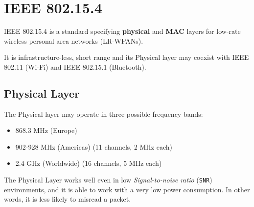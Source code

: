 
\chapter{IEEE 802.15.4}

IEEE 802.15.4 is a standard specifying \textbf{physical} and \textbf{MAC} layers for low-rate wireless personal area networks (LR-WPANs).

It is infrastructure-less, short range and its Physical layer may coexist with IEEE 802.11 (Wi-Fi) and IEEE 802.15.1 (Bluetooth). 

\section*{Physical Layer}

The Physical layer may operate in three possible frequency bands:
\begin{itemize}
   \item 868.3 MHz (Europe)
   \item 902-928 MHz (Americas) (11 channels, 2 MHz each)
   \item 2.4 GHz (Worldwide) (16 channels, 5 MHz each)
\end{itemize}

The Physical Layer works well even in low \textit{Signal-to-noise ratio} (\texttt{SNR}) environments, and it is able to work with a very low power consumption.
In other words, it is less likely to misread a packet.
{\ns{}}


